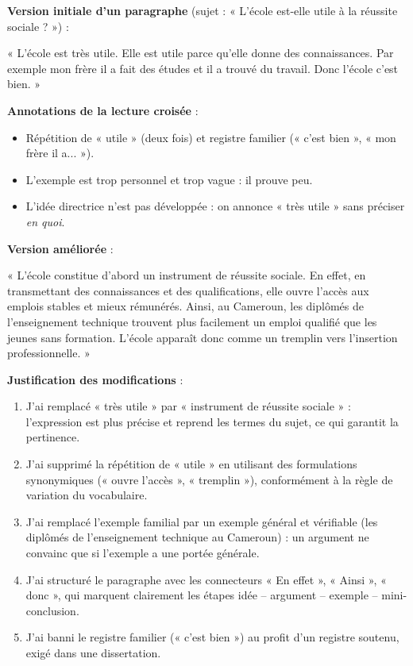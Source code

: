\documentclass[11pt]{article}
\begin{document}
\begin{exoresolu}
\textbf{Version initiale d'un paragraphe} (sujet : « L'école est-elle utile à la réussite sociale ? ») :

« L'école est très utile. Elle est utile parce qu'elle donne des connaissances. Par exemple mon frère il a fait des études et il a trouvé du travail. Donc l'école c'est bien. »

\tcblower

\textbf{Annotations de la lecture croisée} :
\begin{itemize}
\item Répétition de « utile » (deux fois) et registre familier (« c'est bien », « mon frère il a... »).
\item L'exemple est trop personnel et trop vague : il prouve peu.
\item L'idée directrice n'est pas développée : on annonce « très utile » sans préciser \emph{en quoi}.
\end{itemize}

\textbf{Version améliorée} :

« L'école constitue d'abord un instrument de réussite sociale. En effet, en transmettant des connaissances et des qualifications, elle ouvre l'accès aux emplois stables et mieux rémunérés. Ainsi, au Cameroun, les diplômés de l'enseignement technique trouvent plus facilement un emploi qualifié que les jeunes sans formation. L'école apparaît donc comme un tremplin vers l'insertion professionnelle. »

\textbf{Justification des modifications} :
\begin{enumerate}
\item J'ai remplacé « très utile » par « instrument de réussite sociale » : l'expression est plus précise et reprend les termes du sujet, ce qui garantit la pertinence.
\item J'ai supprimé la répétition de « utile » en utilisant des formulations synonymiques (« ouvre l'accès », « tremplin »), conformément à la règle de variation du vocabulaire.
\item J'ai remplacé l'exemple familial par un exemple général et vérifiable (les diplômés de l'enseignement technique au Cameroun) : un argument ne convainc que si l'exemple a une portée générale.
\item J'ai structuré le paragraphe avec les connecteurs « En effet », « Ainsi », « donc », qui marquent clairement les étapes idée -- argument -- exemple -- mini-conclusion.
\item J'ai banni le registre familier (« c'est bien ») au profit d'un registre soutenu, exigé dans une dissertation.
\end{enumerate}
\end{exoresolu}
\end{document}
